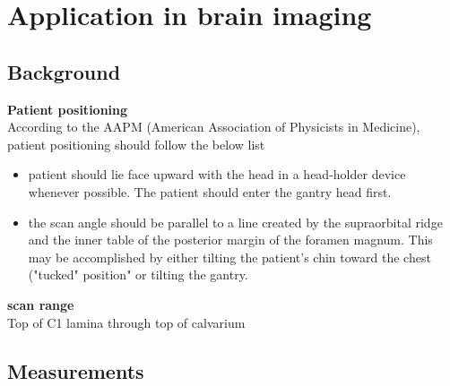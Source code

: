 \chapter{Application in brain imaging}
\section{Background}

\noindent \textbf{Patient positioning} \\
\noindent According to the AAPM (American Association of Physicists in Medicine), patient positioning should follow the below list\citep{aapm_headCT2012}
\begin{itemize}
\item patient should lie face upward with the head in a head-holder device whenever possible.  The patient should enter the gantry head first.
\item the scan angle should be parallel to a line created by the supraorbital ridge and the inner table of the posterior margin of the foramen magnum.  This may be accomplished by either tilting the patient's chin toward the chest ("tucked" position" or tilting the gantry.
\end{itemize}

\noindent \textbf{scan range} \\
\noindent Top of C1 lamina through top of calvarium \\


\section{Measurements}

